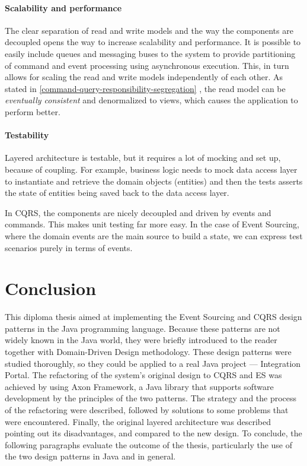 \documentclass{book}
\begin{document}
\paragraph{Scalability and
performance}\label{scalability-and-performance}

The clear separation of read and write models and the way the components
are decoupled opens the way to increase scalability and performance. It
is possible to easily include queues and messaging buses to the system
to provide partitioning of command and event processing using
asynchronous execution. This, in turn allows for scaling the read and
write models independently of each other. As stated in
\ref{command-query-responsibility-segregation}
, the read model can
be \emph{eventually consistent} and denormalized to views, which causes
the application to perform better.

\paragraph{Testability}\label{testability}

Layered architecture is testable, but it requires a lot of mocking and
set up, because of coupling. For example, business logic needs to mock
data access layer to instantiate and retrieve the domain objects
(entities) and then the tests asserts the state of entities being saved
back to the data access layer.

In CQRS, the components are nicely decoupled and driven by events and
commands. This makes unit testing far more easy. In the case of Event
Sourcing, where the domain events are the main source to build a state,
we can express test scenarios purely in terms of events.


\section{Conclusion}\label{conclusion}

This diploma thesis aimed at implementing the Event Sourcing and CQRS
design patterns in the Java programming language. Because these patterns
are not widely known in the Java world, they were briefly introduced to
the reader together with Domain-Driven Design methodology. These design
patterns were studied thoroughly, so they could be applied to a real
Java project --- Integration Portal. The refactoring of the system's
original design to CQRS and ES was achieved by using Axon Framework, a
Java library that supports software development by the principles of the
two patterns. The strategy and the process of the refactoring were
described, followed by solutions to some problems that were encountered.
Finally, the original layered architecture was described pointing out
its disadvantages, and compared to the new design. To conclude, the
following paragraphs evaluate the outcome of the thesis, particularly
the use of the two design patterns in Java and in general.
\end{document}
